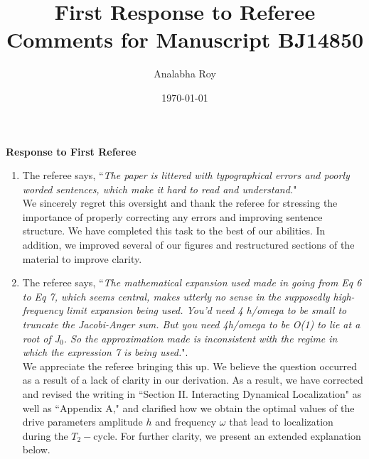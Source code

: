 \documentclass[aps,prb,reprint,showpacs,floatfix,superscriptaddress, onecolumn, nofootinbib, 9pt]{revtex4-2}
\newcommand{\ar}[1]{{\color{blue}#1}} %
\begin{document}

\title{First Response to Referee Comments for Manuscript BJ14850}
\author{Analabha Roy}
\date{\today}

\maketitle

\vspace{1em}

\noindent \textbf{Response to First Referee}

\begin{enumerate}
\item The referee says, ``\textit{The paper is littered with typographical errors and poorly worded sentences, which make it hard to read and understand.}"\\

\ar{
We sincerely regret this oversight and thank the referee for stressing the importance of properly correcting any errors and improving sentence structure. We have completed this task to the best of our abilities. In addition, we improved several of our figures and restructured sections of the material to improve clarity.
}
\item The referee says, ``\textit{The mathematical
expansion used made in going from Eq 6 to Eq 7, which seems central, makes utterly no sense in the supposedly high-frequency limit expansion being used. You'd need 4 h/omega to be small to truncate the Jacobi-Anger sum. But you need 4h/omega to be O(1) to lie at a root of J$_0$. So the approximation made is inconsistent with the regime in which the expression 7 is being used.}".\\

\ar{
We appreciate the referee bringing this up. We believe the question occurred as a result of a lack of clarity in our derivation. As a result, we have corrected and revised the writing in ``Section II. Interacting Dynamical Localization" as well as ``Appendix A," and clarified how we obtain the optimal values of the drive parameters amplitude $h$ and frequency $\omega$ that lead to localization during the $T_2-$cycle. For further clarity, we present an extended explanation below.\\

}
\end{enumerate}
\end{document}
